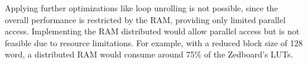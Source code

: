 Applying further optimizations like loop unrolling is not possible, since the
overall performance is restricted by the \ac{RAM}, providing only limited
parallel access. Implementing the \ac{RAM} distributed would allow parallel
access but is not feasible due to resource limitations. For example, with a
reduced block size of 128 word, a distributed \ac{RAM} would consume around
75\% of the Zedboard's \acp{LUT}.
